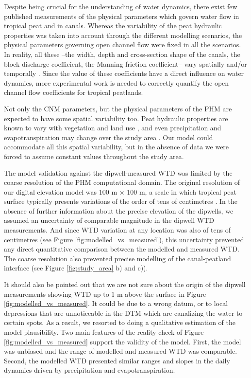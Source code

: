 \documentclass[bg, manuscript]{copernicus}
\begin{document}
Despite being crucial for the understanding of water dynamics, there exist few published measurements of the physical parameters which govern water flow in tropical peat and in canals.
Whereas the variability of the peat hydraulic properties was taken into account through the different modelling scenarios, the physical parameters governing open channel flow were fixed in all the scenarios. 
In reality, all these --the width, depth and cross-section shape of the canals, the block discharge coefficient, the Manning friction coefficient-- vary spatially and/or temporally  \citep{ritzemaCanalBlockingStrategies2014, osakiTropicalPeatlandEcosystems2016}.
Since the value of these coefficients have a direct influence on water dynamics, more experimental work is needed to correctly quantify the open channel flow coefficients for tropical peatlands.

Not only the CNM parameters, but the physical parameters of the PHM are expected to have some spatial variability too.
Peat hydraulic properties are known to vary with vegetation and land use  \citep{bairdHighPermeabilityExplains2017, kurniantoInfluenceLandcoverChanges2019}, and even precipitation and evapotranspiration may change over the study area \citep{vijithSpatialTemporalCharacteristics2020}.
Our model could accommodate all this spatial variability, but in the absence of data we were forced to assume constant values throughout the study area.

The model validation against the dipwell-measured WTD was limited by the coarse resolution of the PHM computational domain.
The original resolution of our digital elevation model was 100 \unit{m} $\times$ 100 \unit{m}, a scale in which tropical peat surface typically presents variations of the order of tens of centimetres \citep{lampelaGroundSurfaceMicrotopography2016}.
In the absence of further information about the precise  elevation of the dipwells, we assumed an uncertainty of comparable magnitude in the dipwell WTD measurements.
And since WTD  variation at any location was also of  tens of centimetres (see Figure \ref{fig:modelled_vs_measured}), this uncertainty prevented any direct quantitative comparison between the modelled and measured WTD.
The coarse resolution also prevented precise modelling of the canal-peatland interface (see Figure \ref{fig:study_area} b) and c)).

It should also be pointed out that we are not sure about the origin of the dipwell measurements showing WTD up to 1 m above the surface in Figure \ref{fig:modelled_vs_measured}.
It could be due to a wrong datum, or to local depressions that are unnoticeable in the DTM which are canalizing the water to certain spots.
As a result, we  resorted to doing a qualitative estimation of the model plausibility.
Two main features of the reality check of Figure \ref{fig:modelled_vs_measured} support the validity of the model.
First, the model was unbiased and the range of modelled and measured WTD was comparable.
Second,  the modelled WTD presented similar ranges and slopes in the daily dynamics driven by precipitation and evapotranspiration.
\end{document}
